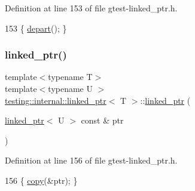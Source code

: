 Definition at line 153 of file gtest-\/linked\+\_\+ptr.\+h.


\begin{DoxyCode}
153 \{ \hyperlink{classtesting_1_1internal_1_1linked__ptr_a0852ab20839140f29b2ad074339fccc7}{depart}(); \}
\end{DoxyCode}
\mbox{\label{classtesting_1_1internal_1_1linked__ptr_a7597ed91006edd0467c99bd1aaab07f5}} 
\subsubsection{\texorpdfstring{linked\+\_\+ptr()}{linked\_ptr()}\hspace{0.1cm}{\footnotesize\ttfamily [2/3]}}
{\footnotesize\ttfamily template$<$typename T$>$ \\
template$<$typename U $>$ \\
\hyperlink{classtesting_1_1internal_1_1linked__ptr}{testing\+::internal\+::linked\+\_\+ptr}$<$ T $>$\+::\hyperlink{classtesting_1_1internal_1_1linked__ptr}{linked\+\_\+ptr} (\begin{DoxyParamCaption}\item[{\hyperlink{classtesting_1_1internal_1_1linked__ptr}{linked\+\_\+ptr}$<$ U $>$ const \&}]{ptr }\end{DoxyParamCaption})\hspace{0.3cm}{\ttfamily [inline]}}



Definition at line 156 of file gtest-\/linked\+\_\+ptr.\+h.


\begin{DoxyCode}
156 \{ \hyperlink{classtesting_1_1internal_1_1linked__ptr_aea2859970b65708fc4f7c8c4cbc7928a}{copy}(&ptr); \}
\end{DoxyCode}
\mbox{\label{classtesting_1_1internal_1_1linked__ptr_abc076b5678cc7f64306d5ecfefc93aff}} 

